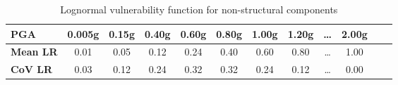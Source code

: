 \begin{table}[htbp]

\centering
\begin{tabular}{ l c c c c c c c c c c c}

\hline
\rowcolor{anti-flashwhite}
\bf{PGA} & \bf{0.005g} & \bf{0.15g} & \bf{0.40g} & \bf{0.60g} & \bf{0.80g} & \bf{1.00g} & \bf{1.20g} & \bf{\dots} & \bf{2.00g} \\
\hline
\bf{Mean LR} & 0.01 & 0.05 & 0.12 & 0.24 & 0.40 & 0.60 & 0.80 & \dots & 1.00 \\
\bf{CoV LR} & 0.03 & 0.12 & 0.24 & 0.32 & 0.32 & 0.24 & 0.12 & \dots & 0.00 \\
\hline
\end{tabular}

\caption{Lognormal vulnerability function for non-structural components}
\label{tab:vf-ln-tax1-nst}
\end{table}